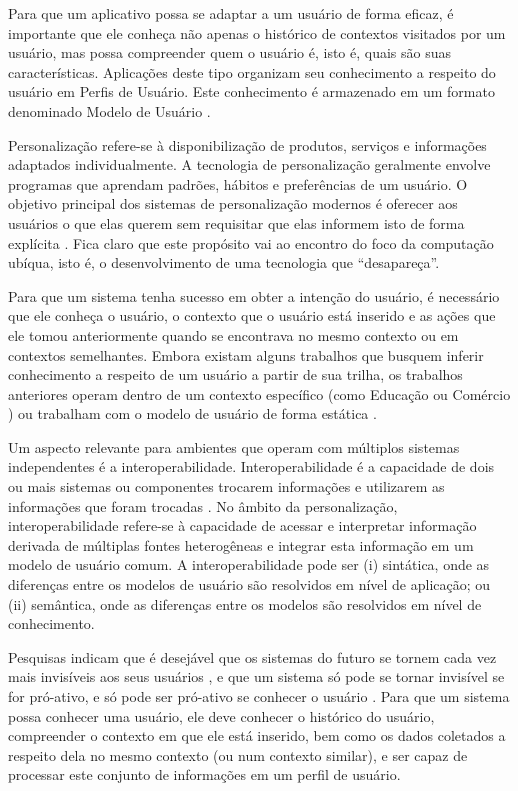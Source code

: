 \documentclass[times, 10pt, twocolumn]{article}
\begin{document}
Para que um aplicativo possa se adaptar a um usuário de forma eficaz, é importante que ele conheça não apenas o histórico de contextos visitados por um usuário, mas possa compreender quem o usuário é, isto é, quais são suas características. Aplicações deste tipo organizam seu conhecimento a respeito do usuário em Perfis de Usuário. Este conhecimento é armazenado em um formato denominado Modelo de Usuário \cite{viviani10}.

Personalização refere-se à disponibilização de produtos, serviços e informações adaptados individualmente. A tecnologia de personalização geralmente envolve programas que aprendam padrões, hábitos e preferências de um usuário. O objetivo principal dos sistemas de personalização modernos é oferecer aos usuários o que elas querem sem requisitar que elas informem isto de forma explícita \cite{mulvenna00}. Fica claro que este propósito vai ao encontro do foco da computação ubíqua, isto é, o desenvolvimento de uma tecnologia que ``desapareça''.

Para que um sistema tenha sucesso em obter a intenção do usuário, é necessário que ele conheça o usuário, o contexto que o usuário está inserido e as ações que ele tomou anteriormente quando se encontrava no mesmo contexto ou em contextos semelhantes. Embora existam alguns trabalhos que busquem inferir conhecimento a respeito de um usuário a partir de sua trilha, os trabalhos anteriores operam dentro de um contexto específico (como Educação \cite{barbosa11} ou Comércio \cite{franco11}) ou trabalham com o modelo de usuário de forma estática \cite{pelep}.

Um aspecto relevante para ambientes que operam com múltiplos sistemas independentes é a interoperabilidade. Interoperabilidade é a capacidade de dois ou mais sistemas ou componentes trocarem informações e utilizarem as informações que foram trocadas \cite{ieeedict}. No âmbito da personalização, interoperabilidade refere-se à capacidade de acessar e interpretar informação derivada de múltiplas fontes heterogêneas e integrar esta informação em um modelo de usuário comum. A interoperabilidade pode ser (i) sintática, onde as diferenças entre os modelos de usuário são resolvidos em nível de aplicação; ou (ii) semântica, onde as diferenças entre os modelos são resolvidos em nível de conhecimento. \cite{carmagnola09}

Pesquisas indicam que é desejável que os sistemas do futuro se tornem cada vez mais invisíveis aos seus usuários \cite{weiser96}, e que um sistema só pode se tornar invisível se for pró-ativo, e só pode ser pró-ativo se conhecer o usuário \cite{satyanarayanan01}. Para que um sistema possa conhecer uma usuário, ele deve conhecer o histórico do usuário, compreender o contexto em que ele está inserido, bem como os dados coletados a respeito dela no mesmo contexto (ou num contexto similar), e ser capaz de processar este conjunto de informações em um perfil de usuário.
\end{document}
